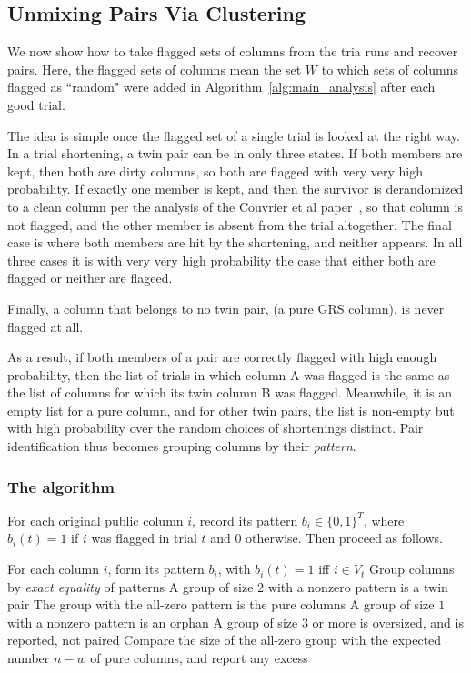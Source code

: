 \subsection{Unmixing Pairs Via Clustering}\label{sec:cluster}
We now show how to take flagged sets of columns from the tria runs and recover
pairs. Here, the flagged sets of columns mean the set $W$
to which sets of columns flagged as ``random" were added in
Algorithm~\ref{alg:main_analysis}
after each good trial.

The idea is simple once the flagged set of a single trial is looked
at the right way. In a trial shortening, a twin pair can be in only three
states. If both members are kept, then both are dirty columns, so
both are flagged with very very high probability.
If exactly one member is kept, and then the survivor
is derandomized to a clean column per the analysis of the Couvrier et al
paper~\cite{CLT18},
so that column is not flagged, and the
other member is absent from the trial altogether. The final case is where both
members
are hit by the shortening, and neither appears. In all three cases
it is with very very high probability the case that either both are flagged or neither
are flageed.

Finally, a column that belongs to no twin pair, (a pure GRS column), is never
flagged at all.

As a result, if both members of a pair are correctly flagged with high enough
probability,
then the list of trials in
which column A was flagged  is the same as the list of columns for which its
twin column B was flagged.
Meanwhile, it is an empty list for a pure column, and for other twin pairs, the
list is non-empty but with
high probability over the random choices of shortenings distinct. Pair
identification thus becomes grouping
columns by their \emph{pattern}.

\subsubsection{The algorithm}

For each original public column $i$, record its pattern
$b_i \in \{0, 1\}^T$, where $b_i(t) = 1$ if $i$ was flagged in
trial $t$ and $0$ otherwise. Then proceed as follows.

\begin{algorithm}[H]
    \caption{Flag-pattern clustering}
    \label{alg:cluster}
    For each column $i$, form its pattern $b_i$, with $b_i(t) = 1$
    iff $i \in V_t$\;
    Group columns by \emph{exact equality} of patterns\;
    A group of size $2$ with a nonzero pattern is a twin pair\;
    The group with the all-zero pattern is the pure columns\;
    A group of size $1$ with a nonzero pattern is an orphan\;
    A group of size $3$ or more is oversized, and is reported, not
    paired\;
    Compare the size of the all-zero group with the expected
    number $n - w$ of pure columns, and report any excess\;
\end{algorithm}



